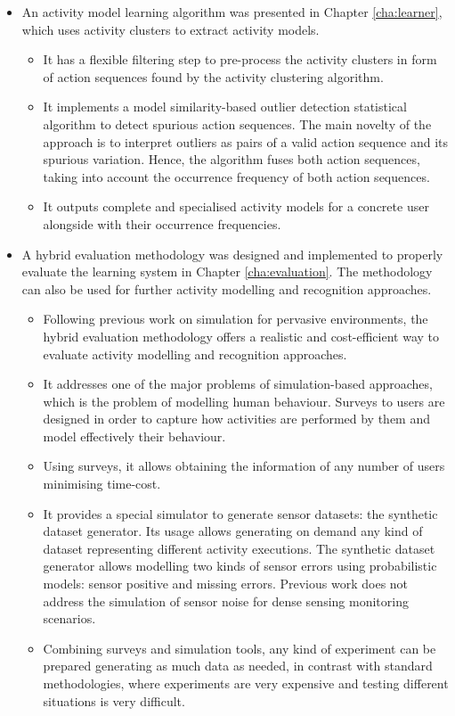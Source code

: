 \begin{itemize}
 \item An activity model learning algorithm was presented in Chapter \ref{cha:learner}, which uses activity clusters to extract activity models. %
 \begin{itemize}
  \item It has a flexible filtering step to pre-process the activity clusters in form of action sequences found by the activity clustering algorithm.
  \item It implements a model similarity-based outlier detection statistical algorithm to detect spurious action sequences. The main novelty of the approach is to interpret outliers as pairs of a valid action sequence and its spurious variation. Hence, the algorithm fuses both action sequences, taking into account the occurrence frequency of both action sequences.
  \item It outputs complete and specialised activity models for a concrete user alongside with their occurrence frequencies.
 \end{itemize}

 \item A hybrid evaluation methodology was designed and implemented to properly evaluate the learning system in Chapter \ref{cha:evaluation}. The methodology can also be used for further activity modelling and recognition approaches. %
 \begin{itemize}
  \item Following previous work on simulation for pervasive environments, the hybrid evaluation methodology offers a realistic and cost-efficient way to evaluate activity modelling and recognition approaches.
  \item It addresses one of the major problems of simulation-based approaches, which is the problem of modelling human behaviour. Surveys to users are designed in order to capture how activities are performed by them and model effectively their behaviour.
  \item Using surveys, it allows obtaining the information of any number of users minimising time-cost.
  \item It provides a special simulator to generate sensor datasets: the synthetic dataset generator. Its usage allows generating on demand any kind of dataset representing different activity executions. The synthetic dataset generator allows modelling two kinds of sensor errors using probabilistic models: sensor positive and missing errors. Previous work does not address the simulation of sensor noise for dense sensing monitoring scenarios.
  \item Combining surveys and simulation tools, any kind of experiment can be prepared generating as much data as needed, in contrast with standard methodologies, where experiments are very expensive and testing different situations is very difficult.
 \end{itemize}

\end{itemize}
